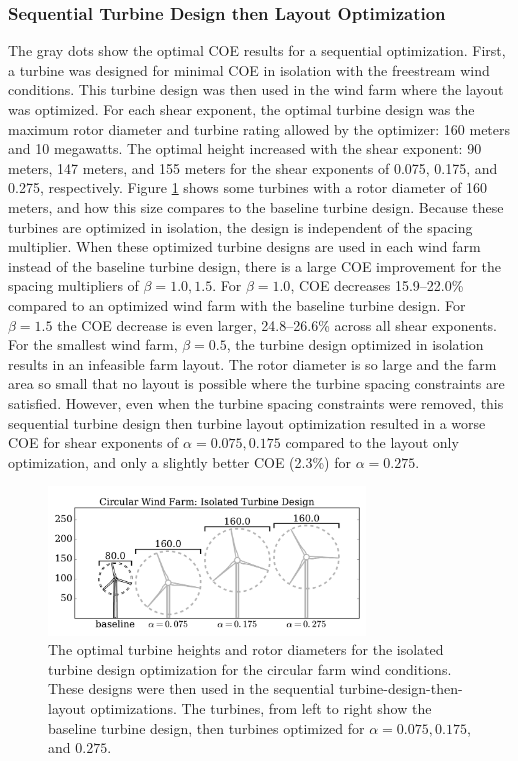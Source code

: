 \subsubsection{Sequential Turbine Design then Layout Optimization}
The gray dots show the optimal COE results for a sequential optimization. First, a turbine was designed for minimal COE in isolation with the freestream wind conditions. This turbine design was then used in the wind farm where the layout was optimized. For each shear exponent, the optimal turbine design was the maximum rotor diameter and turbine rating allowed by the optimizer: 160 meters and 10 megawatts. The optimal height increased with the shear exponent: 90 meters, 147 meters, and 155 meters for the shear exponents of 0.075, 0.175, and 0.275, respectively. Figure \ref{circular_turbines_seq} shows some turbines with a rotor diameter of 160 meters, and how this size compares to the baseline turbine design. Because these turbines are optimized in isolation, the design is independent of the spacing multiplier. When these optimized turbine designs are used in each wind farm instead of the baseline turbine design, there is a large COE improvement for the spacing multipliers of $\beta=1.0, 1.5$. For $\beta=1.0$, COE decreases 15.9--22.0\% compared to an optimized wind farm with the baseline turbine design. For $\beta=1.5$ the COE decrease is even larger, 24.8--26.6\% across all shear exponents. For the smallest wind farm, $\beta=0.5$, the turbine design optimized in isolation results in an infeasible farm layout. The rotor diameter is so large and the farm area so small that no layout is possible where the turbine spacing constraints are satisfied. However, even when the turbine spacing constraints were removed, this sequential turbine design then turbine layout optimization resulted in a worse COE for shear exponents of $\alpha=0.075,0.175$ compared to the layout only optimization, and only a slightly better COE (2.3\%) for $\alpha=0.275$. 


\begin{figure}[htbp]
  \centering
  \includegraphics[width=0.75\textwidth]{Figures/turbineSizesCircular_sequential.pdf}
  \caption{\label{circular_turbines_seq} The optimal turbine heights and rotor diameters for the isolated turbine design optimization for the circular farm wind conditions. These designs were then used in the sequential turbine-design-then-layout optimizations. The turbines, from left to right show the baseline turbine design, then turbines optimized for $\alpha=0.075,0.175$, and $0.275$.}
\end{figure}


